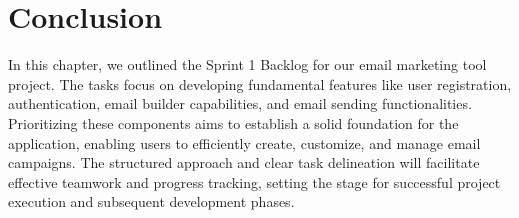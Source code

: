 \clearpage
\section*{Conclusion}


In this chapter, we outlined the Sprint 1 Backlog for our email marketing tool project. The tasks focus on developing fundamental features like user registration, authentication, email builder capabilities, and email sending functionalities. Prioritizing these components aims to establish a solid foundation for the application, enabling users to efficiently create, customize, and manage email campaigns. The structured approach and clear task delineation will facilitate effective teamwork and progress tracking, setting the stage for successful project execution and subsequent development phases.